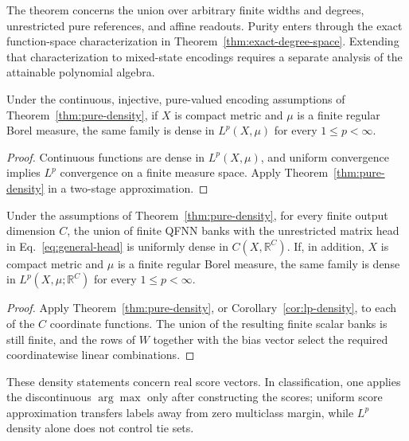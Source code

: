 \documentclass[pdflatex,sn-mathphys,NameDate,iicol]{sn-jnl}
\newcommand{\R}{\mathbb{R}}
\begin{document}
\begin{remark}
The theorem concerns the union over arbitrary finite widths and degrees,
unrestricted pure references, and affine readouts. Purity enters through the
exact function-space characterization in
Theorem~\ref{thm:exact-degree-space}. Extending that characterization to
mixed-state encodings requires a separate analysis of the attainable
polynomial algebra.
\end{remark}

\begin{corollary}[$L^p$ density]
\label{cor:lp-density}
Under the continuous, injective, pure-valued encoding assumptions of
Theorem~\ref{thm:pure-density}, if $X$ is compact metric and $\mu$ is a
finite regular Borel measure, the same family is dense in $L^p(X,\mu)$ for
every $1\le p<\infty$.
\end{corollary}

\begin{proof}
Continuous functions are dense in $L^p(X,\mu)$, and uniform convergence
implies $L^p$ convergence on a finite measure space. Apply
Theorem~\ref{thm:pure-density} in a two-stage approximation.
\end{proof}

\begin{corollary}
\label{cor:vector-density}
Under the assumptions of Theorem~\ref{thm:pure-density}, for every finite
output dimension $C$, the union of finite QFNN banks with the unrestricted
matrix head in Eq.~\eqref{eq:general-head} is uniformly dense in
$C(X,\R^C)$. If, in addition, $X$ is compact metric and $\mu$ is a finite
regular Borel measure, the same family is dense in
$L^p(X,\mu;\R^C)$ for every $1\le p<\infty$.
\end{corollary}

\begin{proof}
Apply Theorem~\ref{thm:pure-density}, or
Corollary~\ref{cor:lp-density}, to each of the $C$ coordinate functions.
The union of the resulting finite scalar banks is still finite, and the rows
of $W$ together with the bias vector select the required coordinatewise
linear combinations.
\end{proof}

These density statements concern real score vectors. In classification, one
applies the discontinuous $\arg\max$ only after constructing the scores;
uniform score approximation transfers labels away from zero multiclass
margin, while $L^p$ density alone does not control tie sets.
\end{document}
